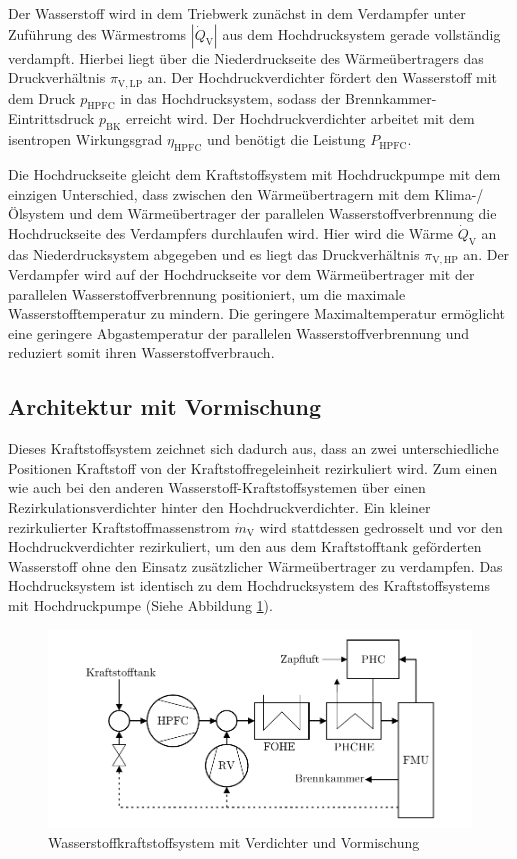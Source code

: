 Der Wasserstoff wird in dem Triebwerk zunächst in dem Verdampfer unter Zuführung des Wärmestroms $|\dot{Q}_\mathrm{V}|$ aus dem Hochdrucksystem gerade vollständig verdampft. Hierbei liegt über die Niederdruckseite des Wärmeübertragers das Druckverhältnis $\pi_{\mathrm{V,LP}}$ an. Der Hochdruckverdichter fördert den Wasserstoff mit dem Druck $p_{\mathrm{HPFC}}$ in das Hochdrucksystem, sodass der Brennkammer-Eintrittsdruck $p_{\mathrm{BK}}$ erreicht wird. Der Hochdruckverdichter arbeitet mit dem isentropen Wirkungsgrad $\eta_{\mathrm{HPFC}}$ und benötigt die Leistung $P_{\mathrm{HPFC}}$. 

Die Hochdruckseite gleicht dem Kraftstoffsystem mit Hochdruckpumpe mit dem einzigen Unterschied, dass zwischen den Wärmeübertragern mit dem Klima-/Ölsystem und dem Wärmeübertrager der parallelen Wasserstoffverbrennung die Hochdruckseite des Verdampfers durchlaufen wird. Hier wird die Wärme $\dot{Q}_\mathrm{V}$ an das Niederdrucksystem abgegeben und es liegt das Druckverhältnis $\pi_{\mathrm{V,HP}}$ an. Der Verdampfer wird auf der Hochdruckseite vor dem Wärmeübertrager mit der parallelen Wasserstoffverbrennung positioniert, um die maximale Wasserstofftemperatur zu mindern. Die geringere Maximaltemperatur ermöglicht eine geringere Abgastemperatur der parallelen Wasserstoffverbrennung und reduziert somit ihren Wasserstoffverbrauch.

\subsection{Architektur mit Vormischung}

Dieses Kraftstoffsystem zeichnet sich dadurch aus, dass an zwei unterschiedliche Positionen Kraftstoff von der Kraftstoffregeleinheit rezirkuliert wird. Zum einen wie auch bei den anderen Wasserstoff-Kraftstoffsystemen über einen Rezirkulationsverdichter hinter den Hochdruckverdichter. Ein kleiner rezirkulierter Kraftstoffmassenstrom $\dot{m}_\mathrm{V}$ wird stattdessen gedrosselt und vor den Hochdruckverdichter rezirkuliert, um den aus dem Kraftstofftank geförderten Wasserstoff ohne den Einsatz zusätzlicher Wärmeübertrager zu verdampfen. Das Hochdrucksystem ist identisch zu dem Hochdrucksystem des Kraftstoffsystems mit Hochdruckpumpe (Siehe Abbildung \ref{fig:vormischung}).

\begin{figure}[ht]
\centering
\includegraphics[width=1\linewidth]{4_Abbildungen/2_Hauptteil/Kraftstoffsystem Abbildungen/dual.pdf}
  \caption{Wasserstoffkraftstoffsystem mit Verdichter und Vormischung}
  \label{fig:vormischung}
\end{figure}
\FloatBarrier 

